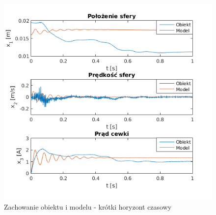 \begin{figure}[H]
\centering
\includegraphics[scale=0.75]{img/zgodnosc_2.png}
\caption{Zachowanie obiektu i modelu - krótki horyzont czasowy}
\label{rys:pochodna_od_polozenia}
\end{figure}



